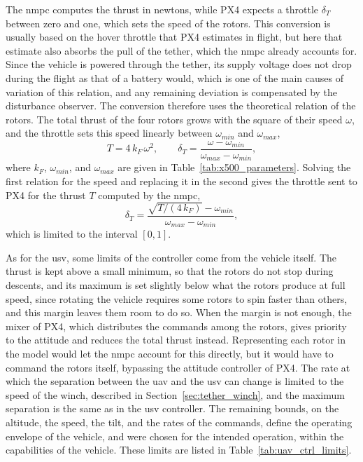 The \gls{nmpc} computes the thrust in newtons, while PX4 expects a throttle $\delta_T$ between zero and one, which sets the speed of the rotors. This conversion is usually based on the hover throttle that PX4 estimates in flight, but here that estimate also absorbs the pull of the tether, which the \gls{nmpc} already accounts for. Since the vehicle is powered through the tether, its supply voltage does not drop during the flight as that of a battery would, which is one of the main causes of variation of this relation, and any remaining deviation is compensated by the disturbance observer. The conversion therefore uses the theoretical relation of the rotors. The total thrust of the four rotors grows with the square of their speed $\omega$, and the throttle sets this speed linearly between $\omega_{min}$ and $\omega_{max}$,
\begin{equation}
    T = 4\,k_F\,\omega^2, \qquad \delta_T = \frac{\omega - \omega_{min}}{\omega_{max} - \omega_{min}},
    \label{eq:uav_rotor_relations}
\end{equation}
where $k_F$, $\omega_{min}$, and $\omega_{max}$ are given in Table~\ref{tab:x500_parameters}. Solving the first relation for the speed and replacing it in the second gives the throttle sent to PX4 for the thrust $T$ computed by the \gls{nmpc},
\begin{equation}
    \delta_T = \frac{\sqrt{T/(4\,k_F)} - \omega_{min}}{\omega_{max} - \omega_{min}},
    \label{eq:uav_thrust_conversion}
\end{equation}
which is limited to the interval $[0,1]$.

As for the \gls{usv}, some limits of the controller come from the vehicle itself. The thrust is kept above a small minimum, so that the rotors do not stop during descents, and its maximum is set slightly below what the rotors produce at full speed, since rotating the vehicle requires some rotors to spin faster than others, and this margin leaves them room to do so. When the margin is not enough, the mixer of PX4, which distributes the commands among the rotors, gives priority to the attitude and reduces the total thrust instead. Representing each rotor in the model would let the \gls{nmpc} account for this directly, but it would have to command the rotors itself, bypassing the attitude controller of PX4. The rate at which the separation between the \gls{uav} and the \gls{usv} can change is limited to the speed of the winch, described in Section~\ref{sec:tether_winch}, and the maximum separation is the same as in the \gls{usv} controller. The remaining bounds, on the altitude, the speed, the tilt, and the rates of the commands, define the operating envelope of the vehicle, and were chosen for the intended operation, within the capabilities of the vehicle. These limits are listed in Table~\ref{tab:uav_ctrl_limits}.

